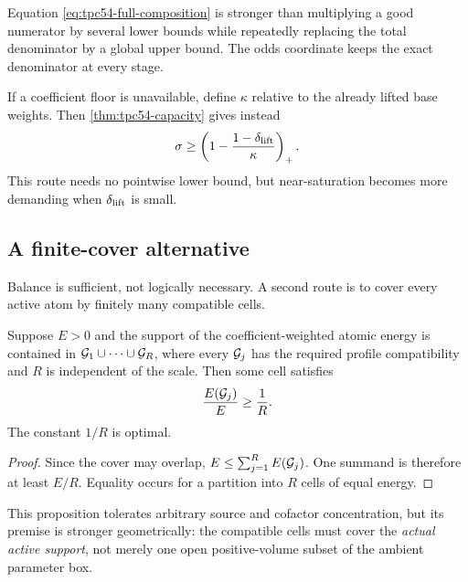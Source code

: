 Equation \eqref{eq:tpc54-full-composition} is stronger than multiplying a
good numerator by several lower bounds while repeatedly replacing the total
denominator by a global upper bound.  The odds coordinate keeps the exact
denominator at every stage.

If a coefficient floor is unavailable, define \(\kappa\) relative to the
already lifted base weights.  Then \cref{thm:tpc54-capacity} gives instead
\begin{equation}
 \sigma\ge
 \left(1-\frac{1-\delta_{\rm lift}}{\kappa}\right)_+.
 \label{eq:tpc54-lifted-capacity}
\end{equation}
This route needs no pointwise lower bound, but near-saturation becomes more
demanding when \(\delta_{\rm lift}\) is small.

\subsection{A finite-cover alternative}

Balance is sufficient, not logically necessary.  A second route is to
cover every active atom by finitely many compatible cells.

\begin{proposition}
\label{prop:tpc54-finite-cover}
Suppose \(E>0\) and the support of the coefficient-weighted atomic energy is contained in
\(\mathcal G_1\cup\cdots\cup\mathcal G_R\), where every \(\mathcal G_j\) has the required
profile compatibility and \(R\) is independent of the scale.  Then some
cell satisfies
\begin{equation}
 \frac{E(\mathcal G_j)}{E}\ge\frac1R.
 \label{eq:tpc54-cover-pigeonhole}
\end{equation}
The constant \(1/R\) is optimal.
\end{proposition}

\begin{proof}
Since the cover may overlap,
\(E\le\sum_{j=1}^R E(\mathcal G_j)\).  One summand is therefore at least
\(E/R\).  Equality occurs for a partition into \(R\) cells of equal
energy.
\end{proof}

This proposition tolerates arbitrary source and cofactor concentration,
but its premise is stronger geometrically: the compatible cells must cover
the \emph{actual active support}, not merely one open positive-volume
subset of the ambient parameter box.
